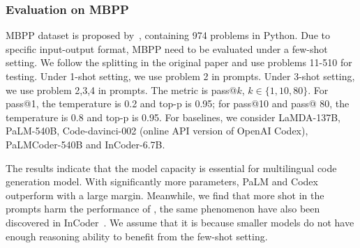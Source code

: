 \subsubsection{Evaluation on MBPP}

MBPP dataset is proposed by~\cite{austin2021program}, containing 974 problems in Python. 
Due to specific input-output format, MBPP need to be evaluated under a few-shot setting.
We follow the splitting in the original paper and use problems 11-510 for testing.
Under 1-shot setting, we use problem 2 in prompts.
Under 3-shot setting, we use problem 2,3,4 in prompts.
The metric is pass@$k$, $k\in\{1, 10, 80\}$.
For pass@1, the temperature is 0.2 and top-p is 0.95; for pass@10 and pass@ 80, the temperature is 0.8 and top-p is 0.95.
For baselines, we consider LaMDA-137B, PaLM-540B, Code-davinci-002 (online API version of OpenAI Codex), PaLMCoder-540B and InCoder-6.7B.

The results indicate that the model capacity is essential for multilingual code generation model.
With significantly more parameters, PaLM and Codex outperform \name with a large margin.
Meanwhile, we find that more shot in the prompts harm the performance of \name, the same phenomenon have also been discovered in InCoder~\citep{fried2022incoder}.
We assume that it is because smaller models do not have enough reasoning ability to benefit from the few-shot setting.

\begin{table}
\centering
\caption{The results of \name on MBPP dataset~\citep{austin2021program}. }
\label{tab:app_mbpp}
\end{table}

